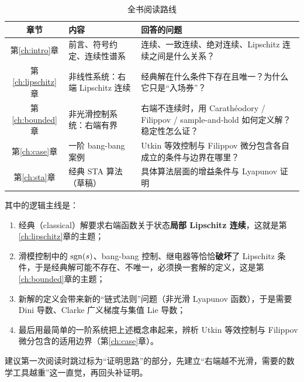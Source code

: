 \begin{table}[!htb]
  \centering
  \small
  \begin{tabular}{@{}c|p{5.6cm}|p{7.0cm}@{}}
    \hline
    章节 & 内容 & 回答的问题 \\
    \hline
    第\ref{ch:intro}章 & 前言、符号约定、连续性谱系 & 连续、一致连续、绝对连续、Lipschitz 连续之间是什么关系？\\
    \hline
    第\ref{ch:lipschitz}章 & 非线性系统：右端 Lipschitz 连续 & 经典解在什么条件下存在且唯一？为什么它只是“入场券”？\\
    \hline
    第\ref{ch:bounded}章 & 非光滑控制系统：右端有界 & 右端不连续时，用 Carathéodory / Filippov / sample-and-hold 如何定义解？稳定性怎么证？\\
    \hline
    第\ref{ch:case}章 & 一阶 bang-bang 案例 & Utkin 等效控制与 Filippov 微分包含各自成立的条件与边界在哪里？\\
    \hline
    第\ref{ch:sta}章 & 经典 STA 算法（草稿） & 具体算法层面的增益条件与 Lyapunov 证明 \\
    \hline
  \end{tabular}
  \caption{全书阅读路线}
  \label{tab:roadmap}
\end{table}

其中的逻辑主线是：

\begin{enumerate}
  \item 经典（classical）解要求右端函数关于状态\textbf{局部 Lipschitz 连续}，这就是第\ref{ch:lipschitz}章的主题；
  \item 滑模控制中的 $\operatorname{sgn}(s)$、bang-bang 控制、继电器等恰恰\textbf{破坏}了 Lipschitz 条件，于是经典解可能不存在、不唯一，必须换一套解的定义，这是第\ref{ch:bounded}章的主题；
  \item 新解的定义会带来新的“链式法则”问题（非光滑 Lyapunov 函数），于是需要 Dini 导数、Clarke 广义梯度与集值 Lie 导数；
  \item 最后用最简单的一阶系统把上述概念串起来，辨析 Utkin 等效控制与 Filippov 微分包含的适用边界（第\ref{ch:case}章）。
\end{enumerate}

建议第一次阅读时跳过标为“证明思路”的部分，先建立“右端越不光滑，需要的数学工具越重”这一直觉，再回头补证明。



